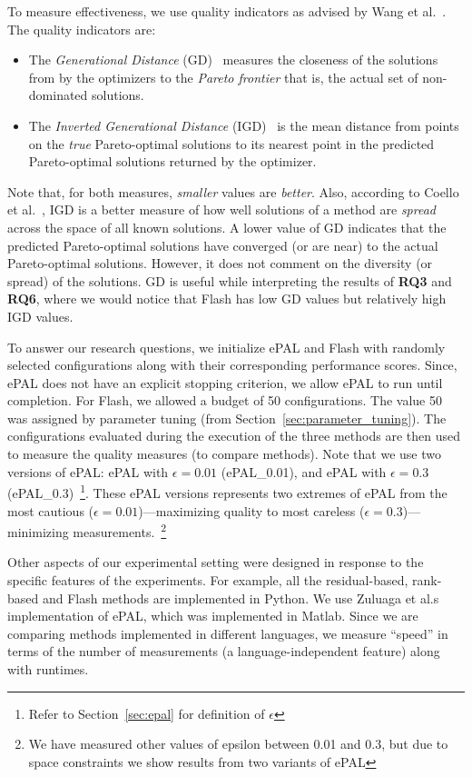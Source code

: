\documentclass[10pt,journal,compsoc]{IEEEtran}
\newcommand{\bi}{\begin{itemize}}
\newcommand{\ei}{\end{itemize}}
\newcommand{\flash}{{\sc Flash}\xspace}
\begin{document}
To measure effectiveness, we use quality indicators as advised by Wang et al.~\cite{wang2016practical}. The quality indicators are:
\bi[leftmargin=*]
\item
The \textit{Generational Distance} (GD)~\cite{van1999multiobjective} measures the closeness  of the solutions from by the optimizers to the 
{\em Pareto frontier} that is, the actual set of non-dominated solutions. 
\item
The \textit{Inverted Generational Distance} (IGD)~\cite{coello2004study}
is the mean distance from points on the  \textit{true} Pareto-optimal solutions to its nearest point in the predicted Pareto-optimal solutions returned by the optimizer.
\ei
Note that, for both measures, {\em smaller} values are {\em better}.
Also,
according to
Coello et al.~\cite{coello2004study}, IGD is a better measure of how well solutions of a method are {\em spread}   across the space of all known solutions. A lower value of GD indicates that the predicted Pareto-optimal solutions have converged (or are near) to the actual Pareto-optimal solutions. However, it does not comment on the diversity (or spread) of the solutions. GD is useful while interpreting the results of \textbf{RQ3} and \textbf{RQ6}, where we would notice that \flash has low GD values but relatively high IGD values.




To answer our research questions, we initialize ePAL and \flash with randomly selected configurations along with their corresponding performance scores. Since, ePAL does not have an explicit stopping criterion, we allow ePAL to run until completion. For \flash, we allowed a budget of 50 configurations. The value 50 was assigned by parameter tuning (from Section~\ref{sec:parameter_tuning}). The configurations evaluated during the execution of the three methods are then used to measure the quality measures (to compare methods).  Note that we use two versions of ePAL: ePAL with $\epsilon=0.01$ (ePAL\_0.01), and ePAL with $\epsilon=0.3$ (ePAL\_0.3)~\footnote{Refer to Section~\ref{sec:epal} for definition of $\epsilon$}. These ePAL versions represents two extremes of ePAL from the most cautious ($\epsilon=0.01$)---maximizing quality to most careless ($\epsilon=0.3$)---minimizing measurements.~\footnote{We have measured other values of epsilon between 0.01 and 0.3, but due to space constraints we show results from two variants of ePAL} 



Other aspects of our experimental setting were designed in response to the specific features of the experiments. For example, all the residual-based, rank-based and \flash methods are implemented in Python. We use Zuluaga et al.\textquotesingle s implementation of ePAL, which was implemented in Matlab. Since we are comparing methods implemented in different languages, we measure ``speed'' in terms of the number of measurements (a language-independent feature) along with runtimes.
\end{document}
